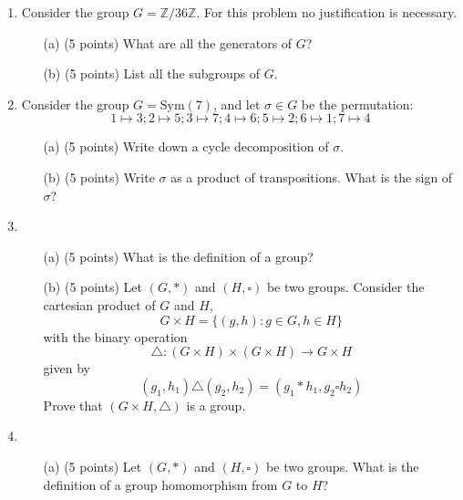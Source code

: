 \documentclass[11pt]{article}
\newcommand{\Z}{\mathbb{Z}}
\begin{document}
\begin{enumerate}
\begin{enumerate}
\end{enumerate}
\pagebreak

\item Consider the group $G = \Z/36\Z$. For this problem no justification is necessary.
\begin{enumerate} \item[(a)] (5 points) What are all the generators of $G$?
\vspace{6cm}
\item[(b)] (5 points) List all the subgroups of $G$.
\vspace{10cm}
\end{enumerate}
\pagebreak

\item Consider the group $G = \text{Sym}(7)$, and let $\sigma\in G$ be the permutation:
$$1\mapsto 3; 2\mapsto 5; 3\mapsto 7; 4\mapsto 6; 5\mapsto 2; 6\mapsto 1; 7\mapsto 4$$
\begin{enumerate}\item[(a)] (5 points) Write down a cycle decomposition of $\sigma$.
\vspace{7cm}
\item[(b)] (5 points) Write $\sigma$ as a product of transpositions. What is the sign of $\sigma$?
\vspace{7cm}
\end{enumerate}
\pagebreak

\item \begin{enumerate}\item[(a)] (5 points) What is the definition of a group?
\vspace{5cm}

\item[(b)] (5 points) Let $(G,*)$ and $(H, \square)$ be two groups. Consider the cartesian product of $G$ and $H$,
$$G\times H = \{(g,h): g\in G, h\in H\}$$
with the binary operation
$$\triangle: (G\times H)\times (G\times H) \longrightarrow G \times H$$
given by
$$(g_1,h_1)\triangle (g_2,h_2) = (g_1*h_1, g_2\square h_2)$$
Prove that $(G\times H, \triangle)$ is a group.
\vspace{8cm}
\end{enumerate}
\pagebreak

\item \begin{enumerate} \item[(a)] (5 points) Let $(G,*)$ and $(H,\square)$ be two groups. What is the definition of a group homomorphism from $G$ to $H$?


\end{enumerate}
\end{enumerate}
\end{document}
